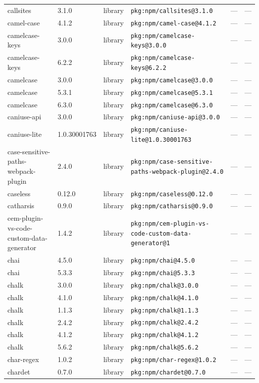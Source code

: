 \documentclass[11pt]{article}
\begin{document}
\begin{longtable}{|l|l|l|p{2.2cm}|l|p{4cm}|}
callsites & 3.1.0 & library & \texttt{pkg:npm/callsites@3.1.0} & — & — \\
camel-case & 4.1.2 & library & \texttt{pkg:npm/camel-case@4.1.2} & — & — \\
camelcase-keys & 3.0.0 & library & \texttt{pkg:npm/camelcase-keys@3.0.0} & — & — \\
camelcase-keys & 6.2.2 & library & \texttt{pkg:npm/camelcase-keys@6.2.2} & — & — \\
camelcase & 3.0.0 & library & \texttt{pkg:npm/camelcase@3.0.0} & — & — \\
camelcase & 5.3.1 & library & \texttt{pkg:npm/camelcase@5.3.1} & — & — \\
camelcase & 6.3.0 & library & \texttt{pkg:npm/camelcase@6.3.0} & — & — \\
caniuse-api & 3.0.0 & library & \texttt{pkg:npm/caniuse-api@3.0.0} & — & — \\
caniuse-lite & 1.0.30001763 & library & \texttt{pkg:npm/caniuse-lite@1.0.30001763} & — & — \\
case-sensitive-paths-webpack-plugin & 2.4.0 & library & \texttt{pkg:npm/case-sensitive-paths-webpack-plugin@2.4.0} & — & — \\
caseless & 0.12.0 & library & \texttt{pkg:npm/caseless@0.12.0} & — & — \\
catharsis & 0.9.0 & library & \texttt{pkg:npm/catharsis@0.9.0} & — & — \\
cem-plugin-vs-code-custom-data-generator & 1.4.2 & library & \texttt{pkg:npm/cem-plugin-vs-code-custom-data-generator@1} & — & — \\
chai & 4.5.0 & library & \texttt{pkg:npm/chai@4.5.0} & — & — \\
chai & 5.3.3 & library & \texttt{pkg:npm/chai@5.3.3} & — & — \\
chalk & 3.0.0 & library & \texttt{pkg:npm/chalk@3.0.0} & — & — \\
chalk & 4.1.0 & library & \texttt{pkg:npm/chalk@4.1.0} & — & — \\
chalk & 1.1.3 & library & \texttt{pkg:npm/chalk@1.1.3} & — & — \\
chalk & 2.4.2 & library & \texttt{pkg:npm/chalk@2.4.2} & — & — \\
chalk & 4.1.2 & library & \texttt{pkg:npm/chalk@4.1.2} & — & — \\
chalk & 5.6.2 & library & \texttt{pkg:npm/chalk@5.6.2} & — & — \\
char-regex & 1.0.2 & library & \texttt{pkg:npm/char-regex@1.0.2} & — & — \\
chardet & 0.7.0 & library & \texttt{pkg:npm/chardet@0.7.0} & — & — \\

\end{longtable}
\end{document}
